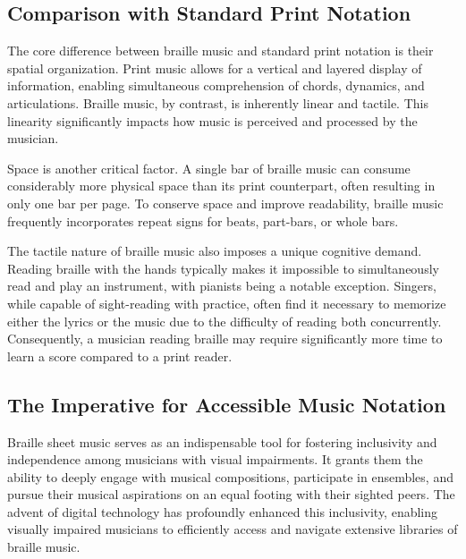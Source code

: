 \subsection{Comparison with Standard Print Notation}\label{subsec:compare-print-notation}
The core difference between braille music and standard print notation is their spatial organization. Print music allows for a vertical and layered display of information, enabling simultaneous comprehension of chords, dynamics, and articulations. Braille music, by contrast, is inherently linear and tactile. \cite{rnib-braille-music} This linearity significantly impacts how music is perceived and processed by the musician.

Space is another critical factor. A single bar of braille music can consume considerably more physical space than its print counterpart, often resulting in only one bar per page. \cite{rnib-braille-music} To conserve space and improve readability, braille music frequently incorporates repeat signs for beats, part-bars, or whole bars. \cite{rnib-braille-music}

The tactile nature of braille music also imposes a unique cognitive demand. Reading braille with the hands typically makes it impossible to simultaneously read and play an instrument, with pianists being a notable exception. Singers, while capable of sight-reading with practice, often find it necessary to memorize either the lyrics or the music due to the difficulty of reading both concurrently. \cite{rnib-braille-music} Consequently, a musician reading braille may require significantly more time to learn a score compared to a print reader. \cite{rnib-braille-music}

\subsection{The Imperative for Accessible Music Notation}\label{subsec:imperative-accessible-music}
Braille sheet music serves as an indispensable tool for fostering inclusivity and independence among musicians with visual impairments. \cite{braillemusicandmore-guide} It grants them the ability to deeply engage with musical compositions, participate in ensembles, and pursue their musical aspirations on an equal footing with their sighted peers. \cite{braillemusicandmore-guide} The advent of digital technology has profoundly enhanced this inclusivity, enabling visually impaired musicians to efficiently access and navigate extensive libraries of braille music. \cite{braillemusicandmore-guide}

